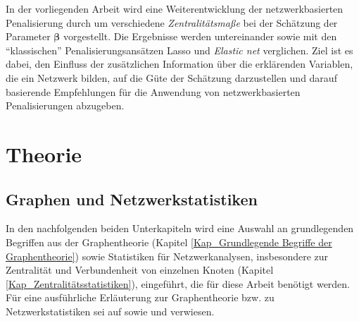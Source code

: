 \documentclass[12pt, a4paper]{report}\usepackage[]{graphicx}\usepackage[]{color}
\begin{document}
In der vorliegenden Arbeit wird eine Weiterentwicklung der netzwerkbasierten Penalisierung durch  um verschiedene \textit{Zentralitätsmaße} bei der Schätzung der Parameter $\boldsymbol{\beta}$ vorgestellt. Die Ergebnisse werden untereinander sowie mit den "`klassischen"' Penalisierungsansätzen Lasso und \textit{Elastic net} \cite{zou_regularization_2005} verglichen. Ziel ist es dabei, den Einfluss der zusätzlichen Information über die erklärenden Variablen, die ein Netzwerk bilden, auf die Güte der Schätzung darzustellen und darauf basierende Empfehlungen für die Anwendung von netzwerkbasierten Penalisierungen abzugeben.






\chapter{Theorie}\label{Kap_Theorie}
\section{Graphen und Netzwerkstatistiken}\label{Kap_Graphen und Netzwerkstatistiken}
%
%
%
%
In den nachfolgenden beiden Unterkapiteln wird eine Auswahl an grundlegenden Begriffen aus der Graphentheorie (Kapitel \ref{Kap_Grundlegende Begriffe der Graphentheorie}) sowie Statistiken für Netzwerkanalysen, insbesondere zur Zentralität und Verbundenheit von einzelnen Knoten (Kapitel \ref{Kap_Zentralitätsstatistiken}), eingeführt, die für diese Arbeit benötigt werden. Für eine ausführliche Erläuterung zur Graphentheorie bzw. zu Netzwerkstatistiken sei auf  sowie  und  verwiesen.\\
\end{document}
